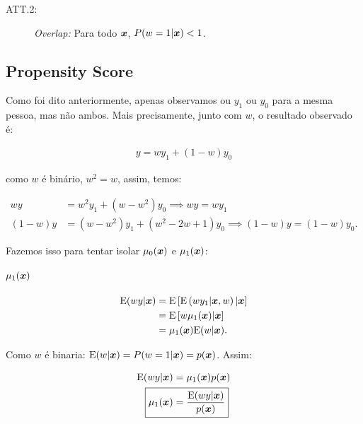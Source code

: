 \documentclass[11pt, oneside, a4paper, article]{article}
\numberwithin{equation}{section}
\begin{document}
\begin{description}
\begin{description}
\item[ATT.2:] \textit{Overlap:} Para todo $\boldsymbol{x}$, $P(w=1 | \boldsymbol{x} ) < 1$.
\end{description}

\subsection{Propensity Score}

Como foi dito anteriormente, apenas observamos ou $y_{1}$ ou $y_{0}$ para a mesma pessoa, mas não ambos.
Mais precisamente, junto com $w$, o resultado observado é:

\vspace{-1 em}
\begin{align*}
	y = wy_{1} + (1 - w) y_{0}
\end{align*}

\noindent
como  $w$ é binário, $w^2 = w$, assim, temos:

\vspace{-1 em}
\begin{align*}
w y &= w^{2} y_{1} + (w - w^{2}) y_{0}
\implies
\boxed{w y = w y_{1} }
\\
( 1 - w ) y &= (w - w^{2}) y_{1} + ( w^{2} - 2w + 1 ) y_{0}
\implies
\boxed{( 1 - w ) y = (1 - w) y_{0}}.
\end{align*}

Fazemos isso para tentar isolar $\mu_{0}(\boldsymbol{x})$ e $\mu_{1}(\boldsymbol{x})$:

\paragraph{$\mu_{1}( \boldsymbol{x} )$}

\begin{align*}
\text{E}( w y | \boldsymbol{x} ) &= \text{E}\left[  \text{E} \left( w y_{1} | \boldsymbol{x}, w  \right) | \boldsymbol{x} \right]
\\ &=
\text{E} \left[ w \mu_{1}(\boldsymbol{x}) | \boldsymbol{x} \right]
\\ &=
\mu_{1}(\boldsymbol{x}) \text{E}(w | \boldsymbol{x} ).
\end{align*}

\noindent
Como $w$ é binaria: $\text{E}(w| \boldsymbol{x}) = P(w=1 | \boldsymbol{x}) = p(\boldsymbol{x})$.
Assim:

\vspace{-1 em}
\begin{align*}
\E( w y | \xvec ) &= \mu_{1}(\xvec) p(\xvec)
\\
\Aboxed{ \mu_{1}(\xvec) &= \frac{\E(w y | \xvec)}{p(\xvec)} }
\end{align*}


\end{description}
\end{document}
